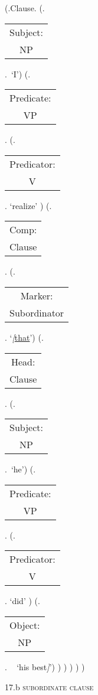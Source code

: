 \documentclass[12pt,letterpaper]{article}
\begin{document}
\begin{figure}
	\begin{center}
		\begin{parsetree}
			(.Clause.
			(.\begin{tabular}{c}Subject:\\NP\end{tabular}.~`I')
			(.\begin{tabular}{c}Predicate:\\VP\end{tabular}.
			(.\begin{tabular}{c}Predicator:\\V\end{tabular}. `realize' )
			(.\begin{tabular}{c}Comp:\\Clause\end{tabular}.
			(.\begin{tabular}{c}Marker:\\Subordinator\end{tabular}.  `\emph{[}\underline{that}')
			(.\begin{tabular}{c}Head:\\Clause\end{tabular}.
			(.\begin{tabular}{c}Subject:\\NP\end{tabular}.~`he')
			(.\begin{tabular}{c}Predicate:\\VP\end{tabular}.
			(.\begin{tabular}{c}Predicator:\\V\end{tabular}. `did' )
			(.\begin{tabular}{c}Object:\\NP\end{tabular}.  ~ `his best\emph{]}')
			)
			)
			)
			)
			)
			
			\hfill \break\hfill \break
		\end{parsetree}
		17.b \textsc{subordinate clause}
	\end{center}
\end{figure}
\end{document}
